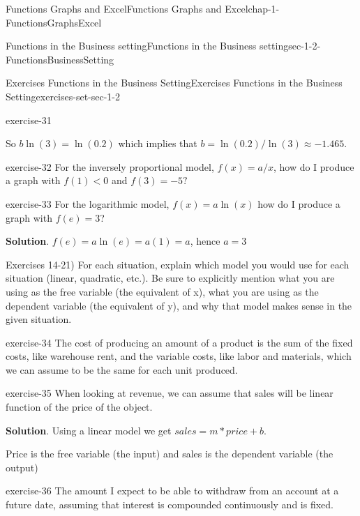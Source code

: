 \documentclass[oneside,10pt,]{book}
\numberwithin{equation}{section}
\newcommand{\lt}{<}
\begin{document}
\begin{chapterptx}{Functions Graphs and Excel}{}{Functions Graphs and Excel}{}{}{chap-1-FunctionsGraphsExcel}
\begin{sectionptx}{Functions in the Business setting}{}{Functions in the Business setting}{}{}{sec-1-2-FunctionsBusinessSetting}
\begin{exercises-subsection-numberless}{Exercises  Functions in the Business Setting}{}{Exercises  Functions in the Business Setting}{}{}{exercises-set-sec-1-2}
\begin{divisionexercise}{11}{}{}{exercise-31}
\par
\hypertarget{p-202}{}%
So \(b \ln(3)=\ln(0.2)\) which implies that \(b=\ln(0.2)/\ln(3) \approx -1.465\).%
\end{divisionexercise}%
\begin{divisionexercise}{12}{}{}{exercise-32}%
\hypertarget{p-203}{}%
For the inversely proportional model, \(f(x)=a/x\), how do I produce a graph with \(f(1) \lt 0\) and \(f(3)=-5?\)%
\end{divisionexercise}%
\begin{divisionexercise}{13}{}{}{exercise-33}%
\hypertarget{p-204}{}%
For the logarithmic model, \(f(x)=a \ln(x)\) how do I produce a graph with \(f(e)=3\)?%
\par\smallskip%
\noindent\textbf{Solution}.\hypertarget{solution-17}{}\quad%
\hypertarget{p-205}{}%
\(f(e)=a \ln(e)=a (1)= a\), hence \(a = 3\)%
\end{divisionexercise}%
\hypertarget{p-206}{}%
Exercises 14-21) For each situation, explain which model you would use for each situation (linear, quadratic, etc.).  Be sure to explicitly mention what you are using as the free variable (the equivalent of x), what you are using as the dependent variable (the equivalent of y), and why that model makes sense in the given situation.%
\begin{divisionexercise}{14}{}{}{exercise-34}%
\hypertarget{p-207}{}%
The cost of producing an amount of a product is the sum of the fixed costs, like warehouse rent, and the variable costs, like labor and materials, which we can assume to be the same for each unit produced.%
\end{divisionexercise}%
\begin{divisionexercise}{15}{}{}{exercise-35}%
\hypertarget{p-208}{}%
When looking at revenue, we can assume that sales will be linear function of the price of the object.%
\par\smallskip%
\noindent\textbf{Solution}.\hypertarget{solution-18}{}\quad%
\hypertarget{p-209}{}%
Using a linear model we get  \(sales=m *price+b\).%
\par
\hypertarget{p-210}{}%
Price is the free variable (the input) and sales is the dependent variable (the output)%
\end{divisionexercise}%
\begin{divisionexercise}{16}{}{}{exercise-36}%
\hypertarget{p-211}{}%
The amount I expect to be able to withdraw from an account at a future date, assuming that interest is compounded continuously and is fixed.%
\end{divisionexercise}%

\end{exercises-subsection-numberless}
\end{sectionptx}
\end{chapterptx}
\end{document}
